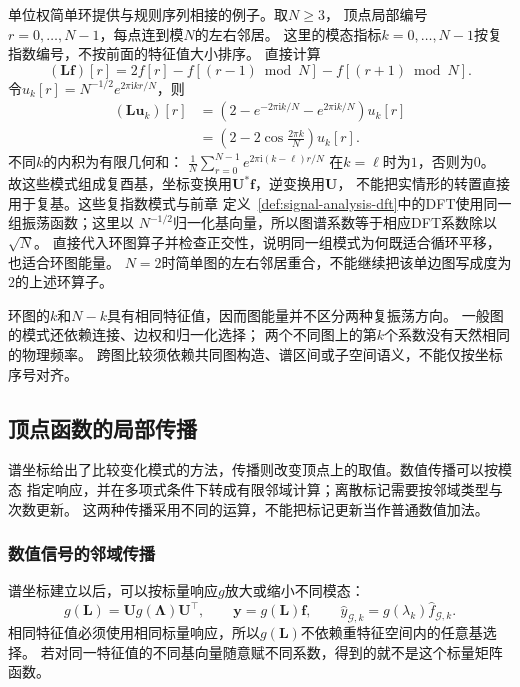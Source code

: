 单位权简单环提供与规则序列相接的例子。取\(N\geq3\)，
顶点局部编号\(r=0,\ldots,N-1\)，每点连到模\(N\)的左右邻居。
这里的模态指标\(k=0,\ldots,N-1\)按复指数编号，不按前面的特征值大小排序。
直接计算
\[
  (\bm L\bm f)[r]=2f[r]-f[(r-1)\bmod N]-f[(r+1)\bmod N].
\]
令\(u_k[r]=N^{-1/2}e^{2\pi\mathrm i kr/N}\)，则
\begin{align*}
  (\bm L\bm u_k)[r]
  &=\left(2-e^{-2\pi\mathrm i k/N}-e^{2\pi\mathrm i k/N}\right)u_k[r]\\
  &=\left(2-2\cos\frac{2\pi k}{N}\right)u_k[r].
\end{align*}
不同\(k\)的内积为有限几何和：
\(\frac1N\sum_{r=0}^{N-1}e^{2\pi\mathrm i(k-\ell)r/N}\)
在\(k=\ell\)时为\(1\)，否则为\(0\)。
故这些模式组成复酉基，坐标变换用\(\bm U^*\bm f\)，逆变换用\(\bm U\)，
不能把实情形的转置直接用于复基。这些复指数模式与前章
定义~\ref{def:signal-analysis-dft}中的DFT使用同一组振荡函数；这里以
\(N^{-1/2}\)归一化基向量，所以图谱系数等于相应DFT系数除以\(\sqrt N\)。
直接代入环图算子并检查正交性，说明同一组模式为何既适合循环平移，也适合环图能量。
\(N=2\)时简单图的左右邻居重合，不能继续把该单边图写成度为\(2\)的上述环算子。

环图的\(k\)和\(N-k\)具有相同特征值，因而图能量并不区分两种复振荡方向。
一般图的模式还依赖连接、边权和归一化选择；
两个不同图上的第\(k\)个系数没有天然相同的物理频率。
跨图比较须依赖共同图构造、谱区间或子空间语义，不能仅按坐标序号对齐。

\subsection{顶点函数的局部传播}

谱坐标给出了比较变化模式的方法，传播则改变顶点上的取值。数值传播可以按模态
指定响应，并在多项式条件下转成有限邻域计算；离散标记需要按邻域类型与次数更新。
这两种传播采用不同的运算，不能把标记更新当作普通数值加法。

\subsubsection{数值信号的邻域传播}

谱坐标建立以后，可以按标量响应\(g\)放大或缩小不同模态：
\[
  g(\bm L)=\bm U g(\bm\Lambda)\bm U^\top,\qquad
  \bm y=g(\bm L)\bm f,\qquad
  \widehat y_{\mathcal G,k}=g(\lambda_k)\widehat f_{\mathcal G,k}.
\]
相同特征值必须使用相同标量响应，所以\(g(\bm L)\)不依赖重特征空间内的任意基选择。
若对同一特征值的不同基向量随意赋不同系数，得到的就不是这个标量矩阵函数。

